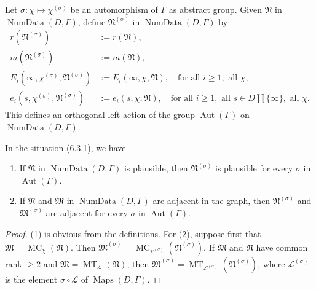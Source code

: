 Let \(\sigma:\chi\mapsto\chi^{(\sigma)}\) be an automorphism of \(\Gamma\) as abstract group. Given \(\mathfrak{N}\) in \(\operatorname{NumData}(D,\Gamma)\), define \(\mathfrak{N}^{(\sigma)}\) in \(\operatorname{NumData}(D,\Gamma)\) by
\[
\begin{aligned}
r(\mathfrak{N}^{(\sigma)})&:=r(\mathfrak{N}),\\
m(\mathfrak{N}^{(\sigma)})&:=m(\mathfrak{N}),\\
E_i(\infty,\chi^{(\sigma)},\mathfrak{N}^{(\sigma)})&:=E_i(\infty,\chi,\mathfrak{N}),\quad\text{for all }i\geq1,\text{ all }\chi,\\
e_i(s,\chi^{(\sigma)},\mathfrak{N}^{(\sigma)})&:=e_i(s,\chi,\mathfrak{N}),\quad\text{for all }i\geq1,\text{ all }s\in D\amalg\{\infty\},\text{ all }\chi.
\end{aligned}
\]
This defines an orthogonal left action of the group \(\operatorname{Aut}(\Gamma)\) on \(\operatorname{NumData}(D,\Gamma)\).

In the situation \hyperref[par:6.3.1]{(6.3.1)}, we have
\begin{enumerate}[label=(\arabic*)]
\item If \(\mathfrak{N}\) in \(\operatorname{NumData}(D,\Gamma)\) is plausible, then \(\mathfrak{N}^{(\sigma)}\) is plausible for every \(\sigma\) in \(\operatorname{Aut}(\Gamma)\).
\item If \(\mathfrak{N}\) and \(\mathfrak{M}\) in \(\operatorname{NumData}(D,\Gamma)\) are adjacent in the graph, then \(\mathfrak{N}^{(\sigma)}\) and \(\mathfrak{M}^{(\sigma)}\) are adjacent for every \(\sigma\) in \(\operatorname{Aut}(\Gamma)\).
\end{enumerate}
\begin{proof}
(1) is obvious from the definitions. For (2), suppose first that \(\mathfrak{M}=\operatorname{MC}_\chi(\mathfrak{N})\). Then \(\mathfrak{M}^{(\sigma)}=\operatorname{MC}_{\chi^{(\sigma)}}(\mathfrak{N}^{(\sigma)})\). If \(\mathfrak{M}\) and \(\mathfrak{N}\) have common rank \(\geq 2\) and \(\mathfrak{M}=\operatorname{MT}_{\mathcal{L}}(\mathfrak{N})\), then \(\mathfrak{M}^{(\sigma)}=\operatorname{MT}_{\mathcal{L}^{(\sigma)}}(\mathfrak{N}^{(\sigma)})\), where \(\mathcal{L}^{(\sigma)}\) is the element \(\sigma\circ\mathcal{L}\) of \(\operatorname{Maps}(D,\Gamma)\).
\end{proof}

